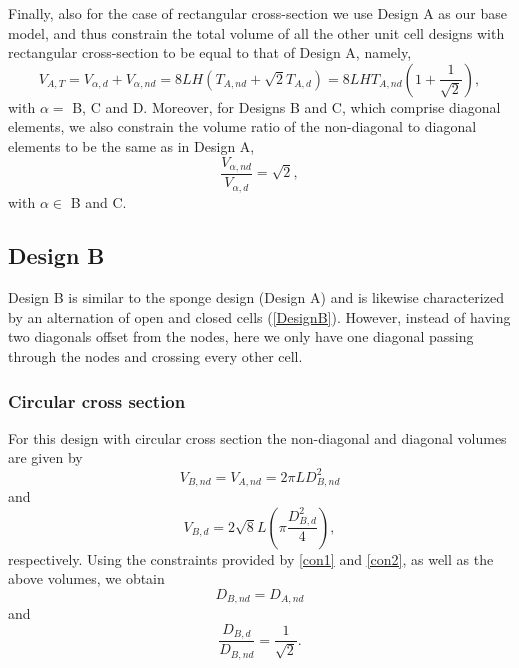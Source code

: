 \documentclass[10pt,twoside]{fernandes_supp}
\begin{document}
Finally, also for the case of rectangular cross-section we use Design A as our base model, and thus constrain the total volume of all the other unit cell designs with rectangular cross-section to be equal to that of Design A, namely,
\begin{equation}\label{con1R}
{V}_{A,T}=V_{\alpha,d}+V_{\alpha,nd}= 8LH(T_{A,nd}+\sqrt{2}T_{A,d})=8LHT_{A,nd}\left(1+\frac{1}{\sqrt{2}}\right),
\end{equation}
with $\alpha=$ B, C and D.
Moreover, for Designs B and C, which comprise diagonal elements, we also  constrain the volume ratio of the non-diagonal to diagonal elements to be the same as in Design A,
\begin{equation}\label{con2R}
\frac{V_{\alpha,nd}}{V_{\alpha,d}}=\sqrt{2},
\end{equation}
with $\alpha\in$ B and C.

\subsection{Design B}
Design B is similar to the sponge design (Design A) and is likewise characterized by an alternation of open and closed cells (\cref{DesignB}). However, instead of having two diagonals offset from the nodes, here we only have one diagonal passing through the nodes and crossing every other cell. 

\subsubsection{Circular cross section}
For this design with circular cross section the non-diagonal and diagonal volumes are given by
\begin{equation}
V_{B,nd}=V_{A,nd}=2\pi L D_{B,nd}^2
\end{equation}
and
\begin{equation}
V_{B,d}=2\sqrt{8} L \left(\pi \frac{{D}_{B,d}^2}{4}\right),
\end{equation}
respectively.
Using the constraints provided by \cref{con1} and \cref{con2}, as well as the above volumes, we  obtain 
\begin{equation}
{{D}_{B,nd}}={{D}_{A,nd}}
\end{equation}
and
\begin{equation}
\frac{{D}_{B,d}}{{D}_{B,nd}}=\frac{1}{\sqrt{2}}.
\end{equation}
\end{document}

